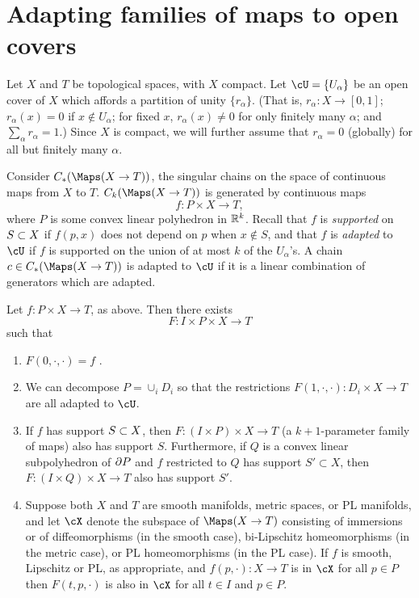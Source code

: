 
\section{Adapting families of maps to open covers}  \label{sec:localising}


Let $X$ and $T$ be topological spaces, with $X$ compact.
Let $\cU = \{U_\alpha\}$ be an open cover of $X$ which affords a partition of
unity $\{r_\alpha\}$.
(That is, $r_\alpha : X \to [0,1]$; $r_\alpha(x) = 0$ if $x\notin U_\alpha$;
for fixed $x$, $r_\alpha(x) \ne 0$ for only finitely many $\alpha$; and $\sum_\alpha r_\alpha = 1$.)
Since $X$ is compact, we will further assume that $r_\alpha = 0$ (globally) 
for all but finitely many $\alpha$. 

Consider  $C_*(\Maps(X\to T))$, the singular chains on the space of continuous maps from $X$ to $T$.
$C_k(\Maps(X \to T))$ is generated by continuous maps
\[
	f: P\times X \to T ,
\]
where $P$ is some convex linear polyhedron in $\mathbb{R}^k$.
Recall that $f$ is {\it supported} on $S\subset X$ if $f(p, x)$ does not depend on $p$ when
$x \notin S$, and that $f$ is {\it adapted} to $\cU$ if 
$f$ is supported on the union of at most $k$ of the $U_\alpha$'s.
A chain $c \in C_*(\Maps(X \to T))$ is adapted to $\cU$ if it is a linear combination of 
generators which are adapted.

\begin{lemma} \label{basic_adaptation_lemma}
Let $f: P\times X \to T$, as above.
Then there exists
\[
	F: I \times P\times X \to T
\]
such that
\begin{enumerate}
\item $F(0, \cdot, \cdot) = f$ .
\item We can decompose $P = \cup_i D_i$ so that
the restrictions $F(1, \cdot, \cdot) : D_i\times X\to T$ are all adapted to $\cU$.
\item If $f$ has support $S\subset X$, then
$F: (I\times P)\times X\to T$ (a $k{+}1$-parameter family of maps) also has support $S$.
Furthermore, if $Q$ is a convex linear subpolyhedron of $\partial P$ and $f$ restricted to $Q$
has support $S' \subset X$, then
$F: (I\times Q)\times X\to T$ also has support $S'$.
\item Suppose both $X$ and $T$ are smooth manifolds, metric spaces, or PL manifolds, and let $\cX$ denote the subspace of $\Maps(X \to T)$ consisting of immersions or of diffeomorphisms (in the smooth case), bi-Lipschitz homeomorphisms (in the metric case), or PL homeomorphisms (in the PL case).
 If $f$ is smooth, Lipschitz or PL, as appropriate, and $f(p, \cdot):X\to T$ is in $\cX$ for all $p \in P$
then $F(t, p, \cdot)$ is also in $\cX$ for all $t\in I$ and $p\in P$.
\end{enumerate}
\end{lemma}

